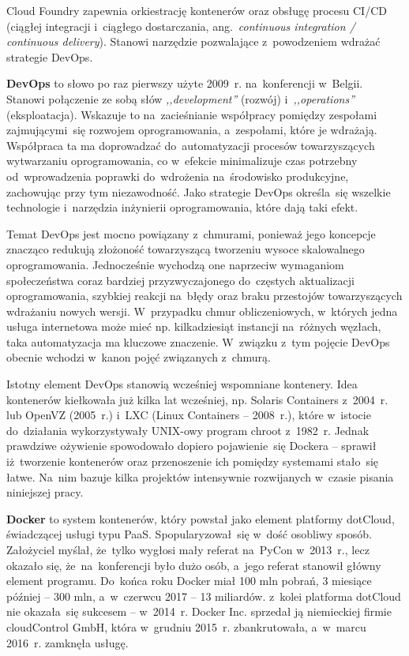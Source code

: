 \documentclass[12pt,a4paper,twoside,titlepage,openright]{book}
\begin{document}
Cloud Foundry zapewnia orkiestrację kontenerów oraz obsługę procesu CI/CD (ciągłej integracji i~ciągłego dostarczania, ang.~\textit{continuous integration / continuous delivery}).\cite{cloudFoundry} Stanowi narzędzie pozwalające z~powodzeniem wdrażać strategie DevOps. 

\textbf{DevOps} to słowo po raz pierwszy użyte 2009~r. na~konferencji w~Belgii. Stanowi połączenie ze sobą słów \textit{,,development''} (rozwój) i~\textit{,,operations''} (eksploatacja). Wskazuje to na~zacieśnianie współpracy pomiędzy zespołami zajmującymi~się rozwojem oprogramowania, a~zespołami, które je wdrażają. Współpraca ta ma doprowadzać do~automatyzacji procesów towarzyszących wytwarzaniu oprogramowania, co w~efekcie minimalizuje czas potrzebny od~wprowadzenia poprawki do~wdrożenia na~środowisko produkcyjne, zachowując przy tym niezawodność. Jako strategie DevOps określa~się wszelkie technologie i~narzędzia inżynierii oprogramowania, które dają taki efekt. \cite{devOpsPackt}

Temat DevOps jest mocno powiązany z~chmurami, ponieważ jego koncepcje znacząco redukują złożoność towarzyszącą tworzeniu wysoce skalowalnego oprogramowania. Jednocześnie wychodzą one naprzeciw wymaganiom społeczeństwa coraz bardziej przyzwyczajonego do~częstych aktualizacji oprogramowania, szybkiej reakcji na~błędy oraz braku przestojów towarzyszących wdrażaniu nowych wersji. W~przypadku chmur obliczeniowych, w~których jedna usługa internetowa może mieć np. kilkadziesiąt instancji na~różnych węzłach, taka automatyzacja ma kluczowe znaczenie. W~związku z~tym pojęcie DevOps obecnie wchodzi w~kanon pojęć związanych z~chmurą.

Istotny element DevOps stanowią wcześniej wspomniane kontenery. Idea kontenerów kiełkowała już kilka lat wcześniej, np. Solaris Containers z~2004~r. lub OpenVZ (2005~r.) i~LXC (Linux Containers -- 2008~r.), które w~istocie do~działania wykorzystywały UNIX-owy program chroot z~1982~r.\cite{siteOperatingSystemVirtualizationWiki} Jednak prawdziwe ożywienie spowodowało dopiero pojawienie~się Dockera -- sprawił iż~tworzenie kontenerów oraz przenoszenie ich pomiędzy systemami stało~się łatwe. Na~nim bazuje kilka projektów intensywnie rozwijanych w~czasie pisania niniejszej pracy.

\textbf{Docker} to system kontenerów, który powstał jako element platformy dotCloud, świadczącej usługi typu PaaS. Spopularyzował~się w~dość osobliwy sposób. Założyciel myślał, że~tylko wygłosi mały referat na~PyCon w~2013~r., lecz okazało się, że~na~konferencji było dużo osób, a~jego referat stanowił główny element programu. Do~końca roku Docker miał 100 mln pobrań, 3 miesiące później -- 300 mln, a~w~czerwcu 2017 -- 13 miliardów.\cite{siteDockerHistory} z~kolei platforma dotCloud nie okazała~się sukcesem -- w~2014~r. Docker Inc. sprzedał ją niemieckiej firmie cloudControl GmbH, która w~grudniu 2015~r. zbankrutowała, a~w~marcu 2016~r. zamknęła usługę.\cite{siteCloudControlWiki}
\end{document}
